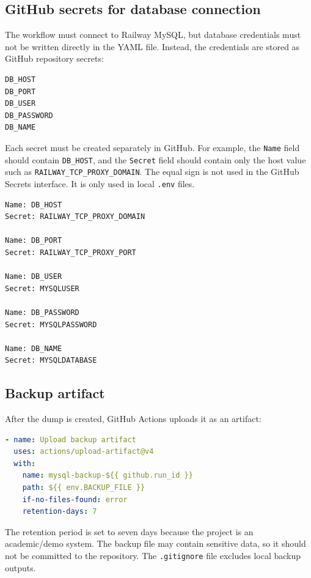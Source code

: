 \documentclass[11pt,a4paper]{report}
\begin{document}
\subsection*{GitHub secrets for database connection}

The workflow must connect to Railway MySQL, but database credentials must not be written directly in the YAML file. Instead, the credentials are stored as GitHub repository secrets:

\begin{lstlisting}[caption={Required GitHub Actions secrets}]
DB_HOST
DB_PORT
DB_USER
DB_PASSWORD
DB_NAME
\end{lstlisting}

Each secret must be created separately in GitHub. For example, the \texttt{Name} field should contain \texttt{DB\_HOST}, and the \texttt{Secret} field should contain only the host value such as \texttt{RAILWAY\_TCP\_PROXY\_DOMAIN}. The equal sign is not used in the GitHub Secrets interface. It is only used in local \texttt{.env} files.

\begin{lstlisting}[caption={Correct GitHub secret format}]
Name: DB_HOST
Secret: RAILWAY_TCP_PROXY_DOMAIN

Name: DB_PORT
Secret: RAILWAY_TCP_PROXY_PORT

Name: DB_USER
Secret: MYSQLUSER

Name: DB_PASSWORD
Secret: MYSQLPASSWORD

Name: DB_NAME
Secret: MYSQLDATABASE
\end{lstlisting}

\subsection*{Backup artifact}

After the dump is created, GitHub Actions uploads it as an artifact:

\begin{lstlisting}[language=yaml,caption={Uploading the compressed backup as an artifact}]
- name: Upload backup artifact
  uses: actions/upload-artifact@v4
  with:
    name: mysql-backup-${{ github.run_id }}
    path: ${{ env.BACKUP_FILE }}
    if-no-files-found: error
    retention-days: 7
\end{lstlisting}

The retention period is set to seven days because the project is an academic/demo system. The backup file may contain sensitive data, so it should not be committed to the repository. The \texttt{.gitignore} file excludes local backup outputs.
\end{document}
